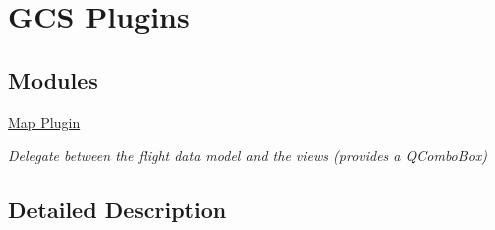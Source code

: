 \hypertarget{group___phoenix_pilot}{\section{G\-C\-S Plugins}
\label{group___phoenix_pilot}
}
\subsection*{Modules}
\begin{DoxyCompactItemize}
\item 
\hyperlink{group___path_planner}{Map Plugin}
\begin{DoxyCompactList}\small\item\em Delegate between the flight data model and the views (provides a Q\-Combo\-Box) \end{DoxyCompactList}\end{DoxyCompactItemize}


\subsection{Detailed Description}
